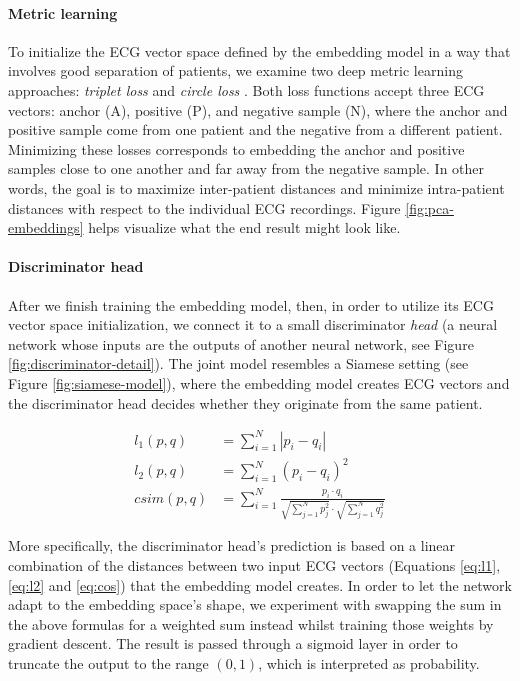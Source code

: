 \documentclass[preprint,12pt]{elsarticle}
\begin{document}
\paragraph{Metric learning}

To initialize the ECG vector space defined by the embedding model in a way that involves good separation of patients, we examine two deep metric learning approaches: \textit{triplet loss} \cite{hoffer2015deep, schroff2015facenet} and \textit{circle loss} \cite{sun2020circle}. Both loss functions accept three ECG vectors: anchor (A), positive (P), and negative sample (N), where the anchor and positive sample come from one patient and the negative from a different patient. Minimizing these losses corresponds to embedding the anchor and positive samples close to one another and far away from the negative sample. In other words, the goal is to maximize inter-patient distances and minimize intra-patient distances with respect to the individual ECG recordings. Figure \ref{fig:pca-embeddings} helps visualize what the end result might look like.



\paragraph{Discriminator head}

After we finish training the embedding model, then, in order to utilize its ECG vector space initialization, we connect it to a small discriminator \textit{head} (a neural network whose inputs are the outputs of another neural network, see Figure \ref{fig:discriminator-detail}). The joint model resembles a Siamese setting (see Figure \ref{fig:siamese-model}), where the embedding model creates ECG vectors and the discriminator head decides whether they originate from the same patient.

\begin{align}
    \label{eq:l1}
    l_1(p, q) & = \sum_{i=1}^{N} |p_i - q_i| \\
    \label{eq:l2}
    l_2(p, q) & = \sum_{i=1}^{N} (p_i - q_i)^2 \\
    \label{eq:cos}
    csim(p, q) & =  \sum_{i=1}^{N} \frac{p_i \cdot q_i}{\sqrt{\sum\limits_{j=1}^{N}{p_j^2}} \cdot \sqrt{\sum\limits_{j=1}^{N}{q_j^2}}}
\end{align}

More specifically, the discriminator head's prediction is based on a linear combination of the distances between two input ECG vectors (Equations \ref{eq:l1}, \ref{eq:l2} and \ref{eq:cos}) that the embedding model creates. In order to let the network adapt to the embedding space's shape, we experiment with swapping the sum in the above formulas for a weighted sum instead whilst training those weights by gradient descent. The result is passed through a sigmoid layer in order to truncate the output to the range $(0,1)$, which is interpreted as probability. 
\end{document}
